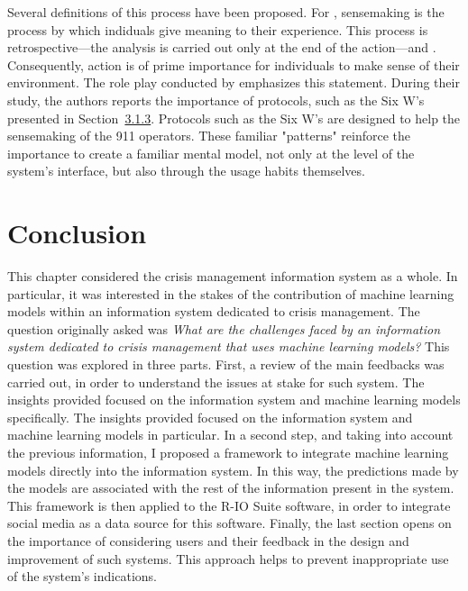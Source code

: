 Several definitions of this process have been proposed.
For \textcite{weickSensemakingOrganizations1995}, sensemaking is the process by which indiduals give meaning to their experience.
This process is retrospective—the analysis is carried out only at the end of the action—and .
Consequently, action is of prime importance for individuals to make sense of their environment.
The role play conducted by \textcite{graceRolePlayingNext2019} emphasizes this statement.
During their study, the authors reports the importance of protocols, such as the Six W's presented in Section~\hyperref[sec:sixws]{3.1.3}.
Protocols such as the Six W's are designed to help the sensemaking of the 911 operators.
These familiar "patterns" reinforce the importance to create a familiar mental model, not only at the level of the system's interface, but also through the usage habits themselves.

\section*{Conclusion}
This chapter considered the crisis management information system as a whole.
In particular, it was interested in the stakes of the contribution of machine learning models within an information system dedicated to crisis management.
The question originally asked was
\textit{What are the challenges faced by an information system dedicated to crisis management that uses machine learning models?}
This question was explored in three parts.
First, a review of the main feedbacks was carried out, in order to understand the issues at stake for such system.
The insights provided focused on the information system and machine learning models specifically.
The insights provided focused on the information system and machine learning models in particular.
In a second step, and taking into account the previous information, I proposed a framework to integrate machine learning models directly into the information system.
In this way, the predictions made by the models are associated with the rest of the information present in the system.
This framework is then applied to the R-IO Suite software, in order to integrate social media as a data source for this software.
Finally, the last section opens on the importance of considering users and their feedback in the design and improvement of such systems.
This approach helps to prevent inappropriate use of the system's indications.

